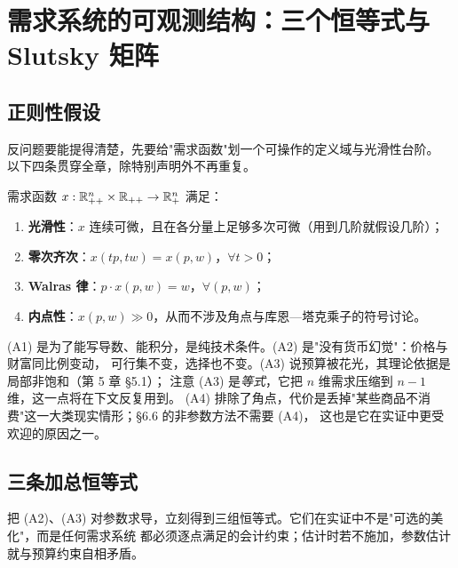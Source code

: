 \section{需求系统的可观测结构：三个恒等式与 Slutsky 矩阵}

\subsection{正则性假设}

反问题要能提得清楚，先要给"需求函数"划一个可操作的定义域与光滑性台阶。
以下四条贯穿全章，除特别声明外不再重复。

\begin{condition}[正则性]\label{cond:regular}
需求函数 $x:\mathbb{R}^n_{++}\times\mathbb{R}_{++}\to\mathbb{R}^n_+$ 满足：
\begin{enumerate}
\item[\textbf{(A1)}] \textbf{光滑性}：$x$ 连续可微，且在各分量上足够多次可微（用到几阶就假设几阶）；
\item[\textbf{(A2)}] \textbf{零次齐次}：$x(tp,tw)=x(p,w)$，$\forall t>0$；
\item[\textbf{(A3)}] \textbf{Walras 律}：$p\cdot x(p,w)=w$，$\forall(p,w)$；
\item[\textbf{(A4)}] \textbf{内点性}：$x(p,w)\gg0$，从而不涉及角点与库恩—塔克乘子的符号讨论。
\end{enumerate}
\end{condition}

\begin{remark}[每条假设在做什么]
(A1) 是为了能写导数、能积分，是纯技术条件。(A2) 是"没有货币幻觉"：价格与财富同比例变动，
可行集不变，选择也不变。(A3) 说预算被花光，其理论依据是局部非饱和（第 5 章 \S 5.1）；
注意 (A3) 是\emph{等式}，它把 $n$ 维需求压缩到 $n-1$ 维，这一点将在下文反复用到。
(A4) 排除了角点，代价是丢掉"某些商品不消费"这一大类现实情形；\S 6.6 的非参数方法不需要 (A4)，
这也是它在实证中更受欢迎的原因之一。
\end{remark}

\subsection{三条加总恒等式}

把 (A2)、(A3) 对参数求导，立刻得到三组恒等式。它们在实证中不是"可选的美化"，而是任何需求系统
都必须逐点满足的会计约束；估计时若不施加，参数估计就与预算约束自相矛盾。

